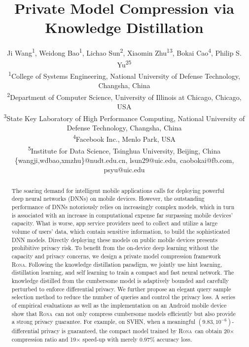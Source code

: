 \documentclass[letterpaper]{article} %
\newcommand*\system{\textsc{Rona}}
\begin{document}
%
\title{Private Model Compression via Knowledge Distillation}
\author{Ji Wang\textsuperscript{1}, Weidong Bao\textsuperscript{1}, Lichao Sun\textsuperscript{2}, Xiaomin Zhu\textsuperscript{1}\textsuperscript{3}, Bokai Cao\textsuperscript{4}, Philip S. Yu\textsuperscript{2}\textsuperscript{5}\\
\textsuperscript{1}{College of Systems Engineering, National University of Defense Technology, Changsha, China}\\
\textsuperscript{2}{Department of Computer Science, University of Illinois at Chicago, Chicago, USA}\\
\textsuperscript{3}{State Key Laboratory of High Performance Computing, National University of Defense Technology, Changsha, China}\\
\textsuperscript{4}{Facebook Inc., Menlo Park, USA}\\
\textsuperscript{5}{Institute for Data Science, Tsinghua University, Beijing, China}\\
\{wangji,wdbao,xmzhu\}@nudt.edu.cn,
lsun29@uic.edu,
caobokai@fb.com,
psyu@uic.edu
}
\maketitle
\begin{abstract}
The soaring demand for intelligent mobile applications calls for deploying powerful deep neural networks (DNNs) on mobile devices. However, the outstanding performance of DNNs notoriously relies on increasingly complex models, which in turn is associated with an increase in computational expense far surpassing mobile devices' capacity. What is worse, app service providers need to collect and utilize a large volume of users' data, which contain sensitive information, to build the sophisticated DNN models. Directly deploying these models on public mobile devices presents prohibitive privacy risk. To benefit from the on-device deep learning without the capacity and privacy concerns, we design a private model compression framework \system. Following the knowledge distillation paradigm, we jointly use hint learning, distillation learning, and self learning to train a compact and fast neural network. The knowledge distilled from the cumbersome model is adaptively bounded and carefully perturbed to enforce differential privacy. We further propose an elegant query sample selection method to reduce the number of queries and control the privacy loss. A series of empirical evaluations as well as the implementation on an Android mobile device show that \system\ can not only compress cumbersome models efficiently but also provide a strong privacy guarantee. For example, on SVHN, when a meaningful $(9.83,10^{-6})$-differential privacy is guaranteed, the compact model trained by \system\ can obtain 20$\times$ compression ratio and 19$\times$ speed-up with merely 0.97\% accuracy loss.
\end{abstract}
\end{document}
